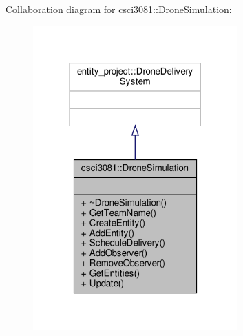 Collaboration diagram for csci3081\+:\+:Drone\+Simulation\+:\nopagebreak
\begin{figure}[H]
\begin{center}
\leavevmode
\includegraphics[width=223pt]{classcsci3081_1_1DroneSimulation__coll__graph}
\end{center}
\end{figure}
